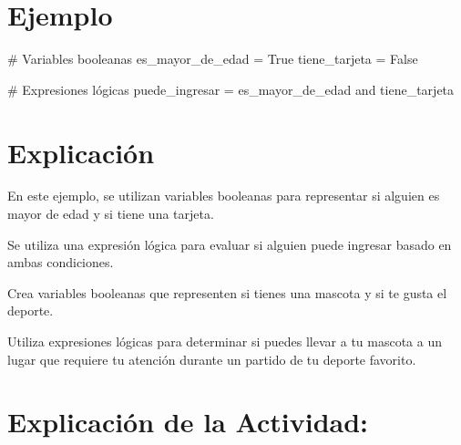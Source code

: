 \documentclass[
  a4paper,
  DIV=11,
  numbers=noendperiod,
  onepage,
  openany]{scrreprt}
\newenvironment{Shaded}{\begin{snugshade}}{\end{snugshade}}
\newcommand{\CommentTok}[1]{\textcolor[rgb]{0.37,0.37,0.37}{#1}}
\newcommand{\KeywordTok}[1]{\textcolor[rgb]{0.00,0.23,0.31}{#1}}
\newcommand{\NormalTok}[1]{\textcolor[rgb]{0.00,0.23,0.31}{#1}}
\newcommand{\OperatorTok}[1]{\textcolor[rgb]{0.37,0.37,0.37}{#1}}
\newcommand{\VariableTok}[1]{\textcolor[rgb]{0.07,0.07,0.07}{#1}}
\begin{document}
\hypertarget{ejemplo-27}{%
\section{Ejemplo}\label{ejemplo-27}}

\begin{Shaded}
\begin{Highlighting}[]
\CommentTok{\# Variables booleanas}
\NormalTok{es\_mayor\_de\_edad }\OperatorTok{=} \VariableTok{True}
\NormalTok{tiene\_tarjeta }\OperatorTok{=} \VariableTok{False}

\CommentTok{\# Expresiones lógicas}
\NormalTok{puede\_ingresar }\OperatorTok{=}\NormalTok{ es\_mayor\_de\_edad }\KeywordTok{and}\NormalTok{ tiene\_tarjeta}
\end{Highlighting}
\end{Shaded}

\hypertarget{explicaciuxf3n-27}{%
\section{Explicación}\label{explicaciuxf3n-27}}

En este ejemplo, se utilizan variables booleanas para representar si
alguien es mayor de edad y si tiene una tarjeta.

Se utiliza una expresión lógica para evaluar si alguien puede ingresar
basado en ambas condiciones.

\begin{tcolorbox}[enhanced jigsaw, colbacktitle=quarto-callout-important-color!10!white, toprule=.15mm, leftrule=.75mm, titlerule=0mm, opacityback=0, rightrule=.15mm, opacitybacktitle=0.6, breakable, left=2mm, coltitle=black, title=\textcolor{quarto-callout-important-color}{\faExclamation}\hspace{0.5em}{Actividad Práctica:}, toptitle=1mm, bottomtitle=1mm, arc=.35mm, bottomrule=.15mm, colback=white, colframe=quarto-callout-important-color-frame]

Crea variables booleanas que representen si tienes una mascota y si te
gusta el deporte.

Utiliza expresiones lógicas para determinar si puedes llevar a tu
mascota a un lugar que requiere tu atención durante un partido de tu
deporte favorito.

\end{tcolorbox}

\hypertarget{explicaciuxf3n-de-la-actividad-25}{%
\section{Explicación de la
Actividad:}\label{explicaciuxf3n-de-la-actividad-25}}
\end{document}
